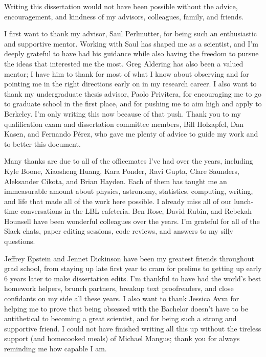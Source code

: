 \documentclass{ucbthesis}
\begin{document}
\begin{frontmatter}



\tableofcontents
\clearpage
\listoffigures
\clearpage
\listoftables
\begin{acknowledgements}
Writing this dissertation would not have been possible without the advice, encouragement, and kindness of my advisors, colleagues, family, and friends.

I first want to thank my advisor, Saul Perlmutter, for being such an enthusiastic and supportive mentor. Working with Saul has shaped me as a scientist, and I'm deeply grateful to have had his guidance while also having the freedom to pursue the ideas that interested me the most. Greg Aldering has also been a valued mentor; I have him to thank for most of what I know about observing and for pointing me in the right directions early on in my research career. I also want to thank my undergraduate thesis advisor, Paolo Privitera, for encouraging me to go to graduate school in the first place, and for pushing me to aim high and apply to Berkeley. I'm only writing this now because of that push. Thank you to my qualification exam and dissertation committee members, Bill Holzapfel, Dan Kasen, and Fernando P\'{e}rez, who gave me plenty of advice to guide my work and to better this document. 

Many thanks are due to all of the officemates I've had over the years, including Kyle Boone, Xiaosheng Huang, Kara Ponder, Ravi Gupta, Clare Saunders, Aleksander Cikota, and Brian Hayden. Each of them has taught me an immeasurable amount about physics, astronomy, statistics, computing, writing, and life that made all of the work here possible. I already miss all of our lunch-time conversations in the LBL cafeteria. Ben Rose, David Rubin, and Rebekah Hounsell have been wonderful colleagues over the years. I'm grateful for all of the Slack chats, paper editing sessions, code reviews, and answers to my silly questions.

Jeffrey Epstein and Jennet Dickinson have been my greatest friends throughout grad school, from staying up late first year to cram for prelims to getting up early 6 years later to make dissertation edits. I'm thankful to have had the world's best homework helpers, brunch partners, breakup text proofreaders, and close confidants on my side all these years. I also want to thank Jessica Avva for helping me to prove that being obsessed with the Bachelor doesn't have to be antithetical to becoming a great scientist, and for being such a strong and supportive friend. I could not have finished writing all this up without the tireless support (and homecooked meals) of Michael Mangus; thank you for always reminding me how capable I am. 


\end{acknowledgements}
\end{frontmatter}
\end{document}
